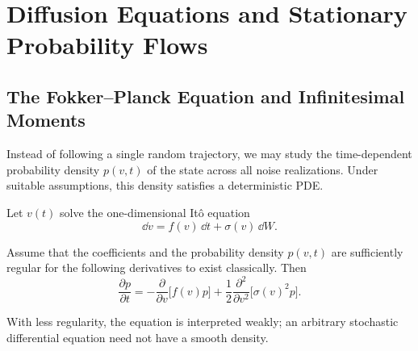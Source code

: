 \section{Diffusion Equations and Stationary Probability Flows}

\subsection{The Fokker--Planck Equation and Infinitesimal Moments}


Instead of following a single random trajectory, we may study the time-dependent probability density $p(v,t)$ of the state across all noise realizations. Under suitable assumptions, this density satisfies a deterministic PDE.

\begin{theorem}
\label{thm:fokker-planck}
Let $v(t)$ solve the one-dimensional It\^o equation
\[
\dd v=f(v)\,\dd t+\sigma(v)\,\dd W.
\]

Assume that the coefficients and the probability density $p(v,t)$ are sufficiently regular for the following derivatives to exist classically. Then
\begin{equation}
\frac{\partial p}{\partial t}
=-\frac{\partial}{\partial v}\big[f(v)p\big]
+\frac12\frac{\partial^2}{\partial v^2}\big[\sigma(v)^2p\big].
\end{equation}

With less regularity, the equation is interpreted weakly; an arbitrary stochastic differential equation need not have a smooth density.
\end{theorem}

